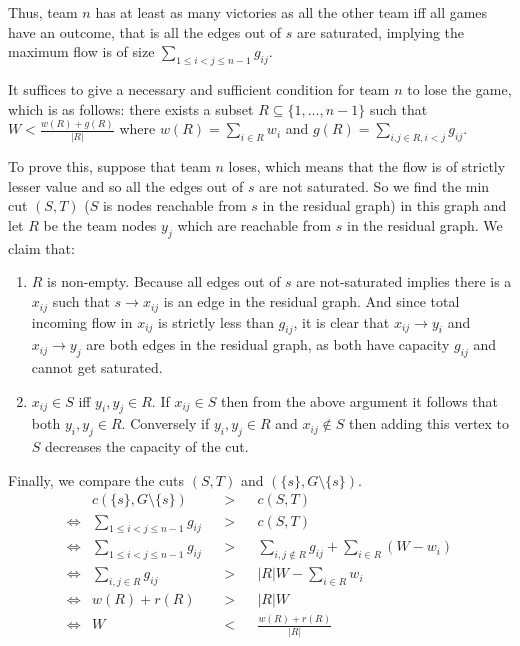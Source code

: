 \documentclass[12pt]{article}
\begin{document}
Thus, team $n$ has at least as many victories as all the other team iff all games have an outcome, that is all the edges out of $s$ are saturated, implying the maximum flow is of size $\sum_{1 \leq i < j \leq n-1} g_{ij}$.
\newline

It suffices to give a necessary and sufficient condition for team $n$ to lose the game, which is as follows: there exists a subset $R \subseteq \{1,\ldots,n-1\}$ such that $W < \frac{w(R) + g(R)}{|R|}$ where $w(R) = \sum_{i \in R} w_i$ and $g(R) = \sum_{i.j \in R, i<j} g_{ij}$.

To prove this, suppose that team $n$ loses, which means that the flow is of strictly lesser value and so all the edges out of $s$ are not saturated. So we find the min cut $(S,T)$ ($S$ is nodes reachable from $s$ in the residual graph) in this graph and let $R$ be the team nodes $y_j$ which are reachable from $s$ in the residual graph. We claim that: 
\begin{enumerate}
    \item $R$ is non-empty. Because all edges out of $s$ are not-saturated implies there is a $x_{ij}$ such that $s \rightarrow x_{ij}$ is an edge in the residual graph. And since total incoming flow in $x_{ij}$ is strictly less than $g_{ij}$, it is clear that $x_{ij} \rightarrow y_i$ and $x_{ij} \rightarrow y_j$ are both edges in the residual graph, as both have capacity $g_{ij}$ and cannot get saturated.
    
    \item $x_{ij} \in S$ iff $y_i, y_j \in R$. If $x_{ij} \in S$ then from the above argument it follows that both $y_i ,y_j \in R$. Conversely if $y_i ,y_j \in R$ and $x_{ij} \not \in S$ then adding this vertex to $S$ decreases the capacity of the cut.
\end{enumerate}

Finally, we compare the cuts $(S,T)$ and $(\{s\}, G \setminus \{s\})$. 
\begin{align*}
    &c(\{s\}, G \setminus \{s\}) &&>&& c(S,T) \\
    \iff &\sum_{1 \leq i < j \leq n-1} g_{ij} &&>&& c(S,T) \\
    \iff &\sum_{1 \leq i < j \leq n-1} g_{ij} &&>&& \sum_{i,j \not \in R} g_{ij} + \sum_{i \in R} (W-w_i) \\
    \iff &\sum_{i,j \in R} g_{ij} &&>&& |R|W - \sum_{i \in R} w_i \\
    \iff &w(R) + r(R) &&>&& |R|W \\
    \iff &W &&<&& \frac{w(R) + r(R)}{|R|}
\end{align*}
\end{document}
